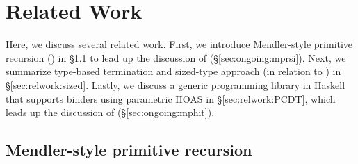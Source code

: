 \section{Related Work}\label{sec:relwork}
Here, we discuss several related work. First, we introduce Mendler-style
primitive recursion (\mpr{}) in \S\ref{sec:relwork:mpr} to lead up
the discussion of \mprsi{} (\S\ref{sec:ongoing:mprsi}). Next, we summarize
type-based termination and sized-type approach (in relation to \mpr{})
in \S\ref{sec:relwork:sized}. Lastly, we discuss a generic programming
library in Haskell that supports binders using parametric HOAS
in \S\ref{sec:relwork:PCDT}, which leads up the discussion of
\mphit{} (\S\ref{sec:ongoing:mphit}).

\subsection{Mendler-style primitive recursion}\label{sec:relwork:mpr}
\begin{figure}

\vspace*{-3ex}
\end{figure}

